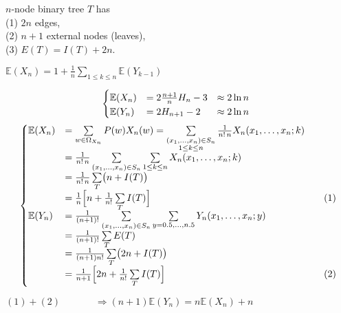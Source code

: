 \documentclass[11pt,fleqn]{article}
\begin{document}
\pagebreak
{}
$n$-node binary tree $T$ has\\ 
\hbox{\qquad}(1) $2n$ edges,\\ 
\hbox{\qquad}(2) $n+1$ external nodes (leaves),\\
\hbox{\qquad}(3) $E(T)=I(T)+2n$. 

$\displaystyle\mathbb{E}(X_n)=1+\frac{1}{n}\sum\limits_{1\le k\le n} \mathbb{E}(Y_{k-1})$

\begin{align*}
	\left\{\begin{matrix*}[l]
		\mathbb{E}(X_n) &= 2 \frac{n+1}{n} H_n - 3 &\approx 2 \ln n\phantom{\Bigl]} \\
		\mathbb{E}(Y_n) &= 2 H_{n+1} - 2 &\approx 2 \ln n
	\end{matrix*}\right.
\end{align*}
\begin{align*}
	\left\{\begin{matrix*}[l]
	\mathbb{E}(X_n)&= \sum\limits_{w \in \Omega_{X_n} } P(w) X_n(w) 
				= \sum\limits_{
						\substack{
						(x_1, \ldots, x_n) \in S_n \\ 
						1 \le k \le n
						}} 
					\frac{1}{n!\,n} X_n (x_1, \ldots, x_n ; k) \\
			&= \frac{1}{n!\,n} 
	\sum\limits_{(x_1, \ldots, x_n) \in S_n} \sum\limits_{1 \le k \le n} 
					X_n (x_1, \ldots, x_n ; k) \\
	&= \frac{1}{n!\,n} \sum\limits_{T} \bigl(n +I(T)\bigr)\\ 
				&= \frac{1}{n} 
			\Bigl[ n + \frac{1}{n!} \sum\limits_{T}I(T)\Bigr] && \text{(1)}\\
\mathbb{E}(Y_n) &= \frac{1}{(n+1)!}\sum\limits_{(x_1, \ldots, x_n) \in S_n}
		\sum\limits_{y = 0.5, \ldots, n.5} Y_n(x_1 , \ldots, x_n ; y) \\
			&= \frac{1}{(n+1)!} \sum\limits_{T}E(T)\\ 
	&=\frac{1}{(n+1)n!}\sum\limits_{T}\bigl(2n +I(T)\bigr) \\
	&= \frac{1}{n+1} \Bigl[2n + \frac{1}{n!} \sum\limits_{T} I(T)\Bigr]&& \text{(2)}
	\end{matrix*}\right.
\end{align*}

\noindent $(1)+(2)\qquad\quad\;\; \Rightarrow(n+1)\mathbb{E}(Y_n)= n\mathbb{E}(X_n)+n$
\end{document}
